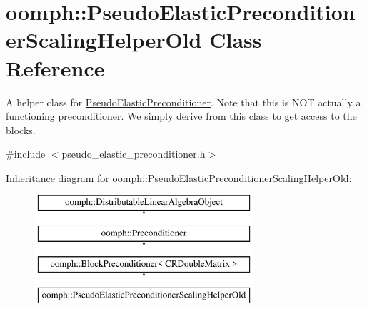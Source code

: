 \hypertarget{classoomph_1_1PseudoElasticPreconditionerScalingHelperOld}{}\section{oomph\+:\+:Pseudo\+Elastic\+Preconditioner\+Scaling\+Helper\+Old Class Reference}
\label{classoomph_1_1PseudoElasticPreconditionerScalingHelperOld}


A helper class for \hyperlink{classoomph_1_1PseudoElasticPreconditioner}{Pseudo\+Elastic\+Preconditioner}. Note that this is N\+OT actually a functioning preconditioner. We simply derive from this class to get access to the blocks.  




{\ttfamily \#include $<$pseudo\+\_\+elastic\+\_\+preconditioner.\+h$>$}

Inheritance diagram for oomph\+:\+:Pseudo\+Elastic\+Preconditioner\+Scaling\+Helper\+Old\+:\begin{figure}[H]
\begin{center}
\leavevmode
\includegraphics[height=4.000000cm]{classoomph_1_1PseudoElasticPreconditionerScalingHelperOld}
\end{center}
\end{figure}
